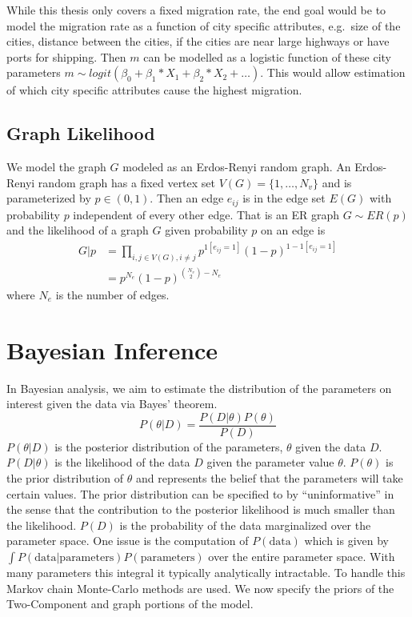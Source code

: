 \documentclass[11pt,a4paper]{article}
\numberwithin{equation}{section}
\begin{document}
While this thesis only covers a fixed migration rate, the end goal would
be to model the migration rate as a function of city specific
attributes, e.g.~size of the cities, distance between the cities, if the
cities are near large highways or have ports for shipping. Then \(m\)
can be modelled as a logistic function of these city parameters
\(m \sim logit(\beta_0 + \beta_1*X_1 + \beta_2*X_2 + \dots)\). This
would allow estimation of which city specific attributes cause the
highest migration.

\hypertarget{graph-likelihood}{%
\subsection{Graph Likelihood}\label{graph-likelihood}}

We model the graph \(G\) modeled as an Erdos-Renyi random graph. An
Erdos-Renyi random graph has a fixed vertex set
\(V(G) = \{1, \dots, N_v\}\) and is parameterized by \(p \in (0,1)\).
Then an edge \(e_{ij}\) is in the edge set \(E(G)\) with probability
\(p\) independent of every other edge. That is an ER graph
\(G \sim ER(p)\) and the likelihood of a graph \(G\) given probability
\(p\) on an edge is
\[\begin{aligned} G|p & = \prod_{i,j \in V(G),i \neq j} p^{1[e_{ij}=1]}(1-p)^{1-1[e_{ij}=1]} 
\\ & = p^{N_e}(1-p)^{\binom{N_v}{2}-N_e} \end{aligned}\] where \(N_e\)
is the number of edges.

\hypertarget{bayesian-inference}{%
\section{Bayesian Inference}\label{bayesian-inference}}

In Bayesian analysis, we aim to estimate the distribution of the
parameters on interest given the data via Bayes' theorem.
\[ P(\theta|D) = \frac{P(D|\theta)P(\theta)}{P(D)} \] \(P(\theta|D)\) is
the posterior distribution of the parameters, \(\theta\) given the data
\(D\). \(P(D|\theta)\) is the likelihood of the data \(D\) given the
parameter value \(\theta\). \(P(\theta)\) is the prior distribution of
\(\theta\) and represents the belief that the parameters will take
certain values. The prior distribution can be specified to by
``uninformative'' in the sense that the contribution to the posterior
likelihood is much smaller than the likelihood. \(P(D)\) is the
probability of the data marginalized over the parameter space. One issue
is the computation of \(P(\text{data})\) which is given by
\(\int P(\text{data}|\text{parameters})P(\text{parameters})\) over the
entire parameter space. With many parameters this integral it typically
analytically intractable. To handle this Markov chain Monte-Carlo
methods are used. We now specify the priors of the Two-Component and
graph portions of the model.
\end{document}
